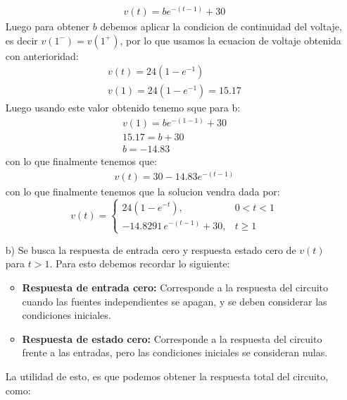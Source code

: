 \documentclass[
  11pt,
  letterpaper,
   addpoints,
   answers
  ]{exam}
\begin{document}
\begin{questions}
\begin{solution}
\begin{enumerate}
\begin{align}
                v(t) = b e^{-(t-1)} + 30
            \end{align}
            Luego para obtener $b$ debemos aplicar la condicion de continuidad del voltaje, es decir $v(1^{-})=v(1^{+})$, por lo que usamos la ecuacion de voltaje obtenida con anterioridad:
            \begin{align}
                v(t) = 24(1-e^{-1})\\
                v(1) = 24(1-e^{-1}) = 15.17 
            \end{align}
            Luego usando este valor obtenido tenemo sque para b:
            \begin{align}
                v(1) = b e^{-(1-1)} + 30\\
                15.17 = b + 30\\
                b = -14.83
            \end{align}
            con lo que finalmente tenemos que:
            \begin{align}
                v(t) = 30 - 14.83 e^{-(t-1)}
            \end{align}
            con lo que finalmente tenemos que la solucion vendra dada por:
            \begin{equation}
                v(t) =
                \begin{cases}
                24\left(1 - e^{-t}\right), & 0 < t < 1 \\
                -14.8291\, e^{-(t-1)} + 30, & t \geq 1
                \end{cases}
                \end{equation}
            \item[b)] Se busca la respuesta de entrada cero y respuesta estado cero de $v(t)$ para $t > 1$. Para esto debemos recordar lo siguiente:
            \begin{itemize}
                \item \textbf{Respuesta de entrada cero:} Corresponde a la respuesta del circuito cuando las fuentes independientes se apagan, y se deben considerar las condiciones iniciales.
                \item \textbf{Respuesta de estado cero:} Corresponde a la respuesta del circuito frente a las entradas, pero las condiciones iniciales se consideran nulas.
            \end{itemize}
            La utilidad de esto, es que podemos obtener la respuesta total del circuito, como:
            \begin{equation}

\end{equation}
\end{enumerate}
\end{solution}
\end{questions}
\end{document}
